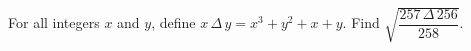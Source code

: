 For all integers $x$ and $y$, define $x\,\Delta\,y=x^3+y^2+x+y$. Find $\sqrt{\dfrac{257\,\Delta\,256}{258}}$.
